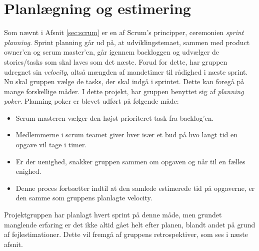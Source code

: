 \section{Planlægning og estimering}\label{sec:planning}
Som nævnt i Afsnit \ref{sec:scrum} er en af Scrum's principper, ceremonien \textit{sprint planning}.
Sprint planning går ud på, at udviklingstemaet, sammen med product owner'en og scrum master'en, går igennem
backloggen og udvælger de stories/tasks som skal laves som det næste. Forud for dette, har gruppen udregnet sin 
\textit{velocity}, altså mængden af mandetimer til rådighed i næste sprint. \\

Nu skal gruppen vælge de tasks, der skal indgå i sprintet. Dette kan foregå på mange forskellige måder.
I dette projekt, har gruppen benyttet sig af \textit{planning poker}. Planning poker er blevet udført på følgende måde:

\begin{itemize}
    \item Scrum masteren vælger den højst prioriteret task fra backlog'en.
    \item Medlemmerne i scrum teamet giver hver især et bud på hvo langt tid en opgave vil tage i timer.
    \item Er der uenighed, snakker gruppen sammen om opgaven og når til en fælles enighed.
    \item Denne proces fortsætter indtil at den samlede estimerede tid på opgaverne, er den samme som gruppens planlagte velocity.
\end{itemize}

Projektgruppen har planlagt hvert sprint på denne måde, men grundet manglende erfaring er det ikke altid gået helt efter planen, blandt andet på grund
af fejlestimationer. Dette vil fremgå af gruppens retrospektiver, som ses i næste afsnit.